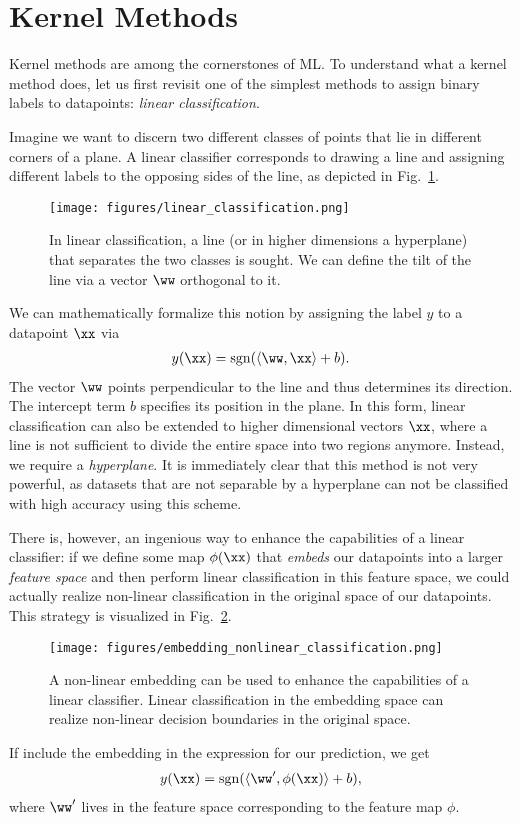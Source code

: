 \documentclass[twocolumn,superscriptaddress,nofootinbib]{revtex4-2}
\newcommand{\sgn}{\ensuremath{\operatorname{sgn}}}
\begin{document}
\section{Kernel Methods}\label{sec:kernels}
Kernel methods are among the cornerstones of \ac{ML}.
To understand what a kernel method does, let us first revisit one of the simplest methods to assign binary labels to datapoints: \emph{linear classification}.
    
Imagine we want to discern two different classes of points that lie in different corners of a plane.
A linear classifier corresponds to drawing a line and assigning different labels to the opposing sides of the line, as depicted in Fig.~\ref{fig:linear_classification}.
%
\begin{figure}
    \centering
    \texttt{[image: figures/linear\_classification.png]}
    \caption{In linear classification, a line (or in higher dimensions a hyperplane) that separates the two classes is sought. We can define the tilt of the line via a vector $\ww$ orthogonal to it.}
    \label{fig:linear_classification}
\end{figure}
%
We can mathematically formalize this notion by assigning the label $y$ to a datapoint $\xx$ via
\begin{align}
   y(\xx) = \sgn(\langle \ww, \xx\rangle + b). 
\end{align}
The vector $\ww$ points perpendicular to the line and thus determines its direction. The intercept term $b$ specifies its position in the plane.
In this form, linear classification can also be extended to higher dimensional vectors $\xx$, where a line is not sufficient to divide the entire space into two regions anymore. Instead, we require a \emph{hyperplane}.
It is immediately clear that this method is not very powerful, as datasets that are not separable by a hyperplane can not be classified with high accuracy using this scheme. 

There is, however, an ingenious way to enhance the capabilities of a linear classifier: if we define some map $\phi(\xx)$ that \emph{embeds} our datapoints into a larger \emph{feature space} and then perform linear classification in this feature space, we could actually realize non-linear classification in the original space of our datapoints. This strategy is visualized in Fig.~\ref{fig:embedding_nonlinear_classification}.
%
\begin{figure}
    \centering
    \texttt{[image: figures/embedding\_nonlinear\_classification.png]}
    \caption{A non-linear embedding can be used to enhance the capabilities of a linear classifier. Linear classification in the embedding space can realize non-linear decision boundaries in the original space.}
    \label{fig:embedding_nonlinear_classification}
\end{figure}
%
If include the embedding in the expression for our prediction, we get
\begin{align}\label{eqn:linear_classification_in_feature_space}
y(\xx) = \sgn(\langle \ww', \phi(\xx)\rangle + b),
\end{align}
where $\ww'$ lives in the feature space corresponding to the feature map $\phi$.
\end{document}
